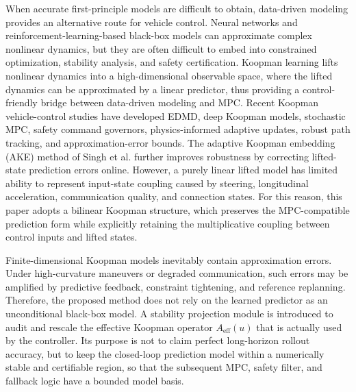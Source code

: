 \documentclass[twocolumn,3p,times,procedia]{elsarticle}
\begin{document}
When accurate first-principle models are difficult to obtain, data-driven modeling provides an alternative route for vehicle control. Neural networks and reinforcement-learning-based black-box models can approximate complex nonlinear dynamics, but they are often difficult to embed into constrained optimization, stability analysis, and safety certification. Koopman learning lifts nonlinear dynamics into a high-dimensional observable space, where the lifted dynamics can be approximated by a linear predictor, thus providing a control-friendly bridge between data-driven modeling and MPC\cite{brunton2016koopmanControl,korda2018koopmanMpc,xiao2022deepKoopmanVehicle,joglekar2023koopmanExperimental}. Recent Koopman vehicle-control studies have developed EDMD, deep Koopman models, stochastic MPC, safety command governors, physics-informed adaptive updates, robust path tracking, and approximation-error bounds\cite{kim2025ksmpc,chen2024koopmanSafetyGovernor,wang2026deepKoopmanRobustTracking,zhang2025physicsInformedAdaptiveKoopman,chen2024esoDeepKoopman,philipp2023koopmanErrorBounds,cibulka2021koopmanVehicleMpc}. The adaptive Koopman embedding (AKE) method of Singh et al. further improves robustness by correcting lifted-state prediction errors online\cite{singh2025adaptiveKoopman}. However, a purely linear lifted model has limited ability to represent input-state coupling caused by steering, longitudinal acceleration, communication quality, and connection states. For this reason, this paper adopts a bilinear Koopman structure, which preserves the MPC-compatible prediction form while explicitly retaining the multiplicative coupling between control inputs and lifted states.

Finite-dimensional Koopman models inevitably contain approximation errors. Under high-curvature maneuvers or degraded communication, such errors may be amplified by predictive feedback, constraint tightening, and reference replanning. Therefore, the proposed method does not rely on the learned predictor as an unconditional black-box model. A stability projection module is introduced to audit and rescale the effective Koopman operator $A_{\mathrm{eff}}(u)$ that is actually used by the controller. Its purpose is not to claim perfect long-horizon rollout accuracy, but to keep the closed-loop prediction model within a numerically stable and certifiable region, so that the subsequent MPC, safety filter, and fallback logic have a bounded model basis.
\end{document}
